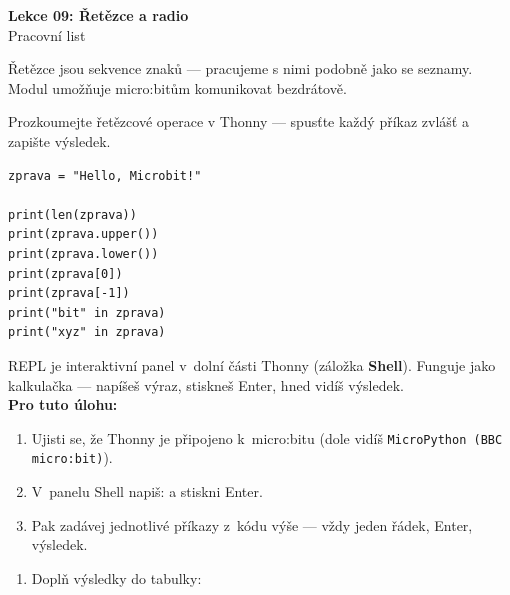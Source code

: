 \newcommand{\lekce}{Lekce 09 -- Pracovní list}




\begin{center}
  {\Large\bfseries\textcolor{microbit-blue}{Lekce 09: Řetězce a radio}}\\[4pt]
  {\large Pracovní list}
\end{center}

\medskip\noindent
Řetězce jsou sekvence znaků — pracujeme s nimi podobně jako se seznamy.
Modul  umožňuje micro:bitům komunikovat bezdrátově.

\begin{ukol}

Prozkoumejte řetězcové operace v Thonny — spusťte každý příkaz zvlášť
a zapište výsledek.

\begin{lstlisting}
zprava = "Hello, Microbit!"

print(len(zprava))
print(zprava.upper())
print(zprava.lower())
print(zprava[0])
print(zprava[-1])
print("bit" in zprava)
print("xyz" in zprava)
\end{lstlisting}

\medskip
\begin{tcolorbox}[colback=code-bg, colframe=gray!40, fonttitle=\small\bfseries,
                  title=Jak použít REPL v Thonny]
  \small
  REPL je interaktivní panel v~dolní části Thonny (záložka \textbf{Shell}).
  Funguje jako kalkulačka — napíšeš výraz, stiskneš Enter, hned vidíš výsledek.\\[4pt]
  \textbf{Pro tuto úlohu:}
  \begin{enumerate}[leftmargin=*, itemsep=1pt]
    \item Ujisti se, že Thonny je připojeno k~micro:bitu (dole vidíš \texttt{MicroPython (BBC micro:bit)}).
    \item V~panelu Shell napiš:  a stiskni Enter.
    \item Pak zadávej jednotlivé příkazy z~kódu výše — vždy jeden řádek, Enter, výsledek.
  \end{enumerate}
\end{tcolorbox}

\begin{enumerate}
  \item Doplň výsledky do tabulky:
        \medskip


\end{enumerate}
\end{ukol}
